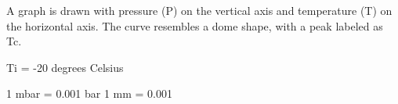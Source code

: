 A graph is drawn with pressure (P) on the vertical axis and temperature (T) on the horizontal axis. The curve resembles a dome shape, with a peak labeled as Tc.  

Ti = -20 degrees Celsius  

1 mbar = 0.001 bar  
1 mm = 0.001